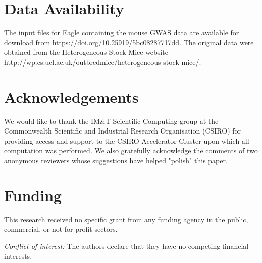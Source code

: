 \documentclass{bioinfo}
\begin{document}
\section*{Data Availability}
The input files for Eagle containing the mouse GWAS data are available for download from 
https://doi.org/10.25919/5bc08287717dd. The original data were obtained from the Heterogeneous Stock Mice website 
http://wp.cs.ucl.ac.uk/outbredmice/heterogeneous-stock-mice/.  



\section*{Acknowledgements}
We would like to thank the IM\&T Scientific Computing group at the Commonwealth Scientific and Industrial Research Organisation (CSIRO) for providing access and support to the CSIRO Accelerator Cluster upon which all computation was performed. 
We also gratefully acknowledge the comments of two anonymous reviewers whose suggestions have helped "polish" this paper. 


\section*{Funding}
This research received no specific grant from any funding agency in the public, commercial, or not-for-profit sectors.

\vspace{1cm}
\noindent
{\em Conflict of interest:} The authors declare that they have no
competing financial interests.
\end{document}
